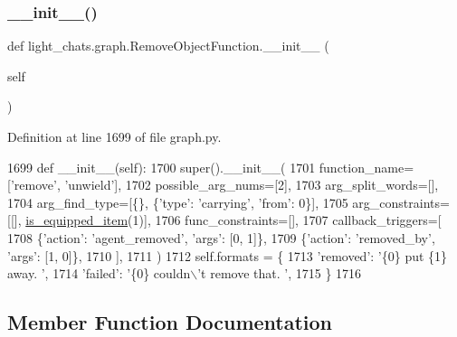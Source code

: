 \subsubsection{\texorpdfstring{\+\_\+\+\_\+init\+\_\+\+\_\+()}{\_\_init\_\_()}}
{\footnotesize\ttfamily def light\+\_\+chats.\+graph.\+Remove\+Object\+Function.\+\_\+\+\_\+init\+\_\+\+\_\+ (\begin{DoxyParamCaption}\item[{}]{self }\end{DoxyParamCaption})}



Definition at line 1699 of file graph.\+py.


\begin{DoxyCode}
1699     \textcolor{keyword}{def }\_\_init\_\_(self):
1700         super().\_\_init\_\_(
1701             function\_name=[\textcolor{stringliteral}{'remove'}, \textcolor{stringliteral}{'unwield'}],
1702             possible\_arg\_nums=[2],
1703             arg\_split\_words=[],
1704             arg\_find\_type=[\{\}, \{\textcolor{stringliteral}{'type'}: \textcolor{stringliteral}{'carrying'}, \textcolor{stringliteral}{'from'}: 0\}],
1705             arg\_constraints=[[], \hyperlink{namespacelight__chats_1_1graph_a76960b89046df1b0cda1de931fa1fd69}{is\_equipped\_item}(1)],
1706             func\_constraints=[],
1707             callback\_triggers=[
1708                 \{\textcolor{stringliteral}{'action'}: \textcolor{stringliteral}{'agent\_removed'}, \textcolor{stringliteral}{'args'}: [0, 1]\},
1709                 \{\textcolor{stringliteral}{'action'}: \textcolor{stringliteral}{'removed\_by'}, \textcolor{stringliteral}{'args'}: [1, 0]\},
1710             ],
1711         )
1712         self.formats = \{
1713             \textcolor{stringliteral}{'removed'}: \textcolor{stringliteral}{'\{0\} put \{1\} away. '},
1714             \textcolor{stringliteral}{'failed'}: \textcolor{stringliteral}{'\{0\} couldn\(\backslash\)'t remove that. '},
1715         \}
1716 
\end{DoxyCode}


\subsection{Member Function Documentation}
\mbox{\label{classlight__chats_1_1graph_1_1RemoveObjectFunction_ae7b012e25908e96e2aaffcd567c0e133}} 
